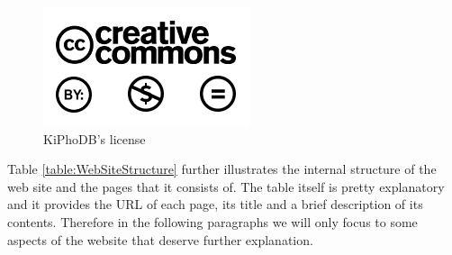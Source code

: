 \begin{figure}[htp]
\centering
\includegraphics[scale=0.6]{pictures/license.png}
\caption{KiPhoDB's license}
\label{license}
\end{figure}

Table \ref{table:WebSiteStructure} further illustrates the internal structure of the web site and the pages that it consists of.
The table itself is pretty explanatory and it provides the URL of each page, its title and a brief description of its contents.
Therefore in the following paragraphs we will only focus to some aspects of the website that deserve further explanation.

